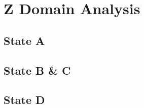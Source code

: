 \label{ch:ZDomainAnalysis}
\chapter{Z Domain Analysis}

\section{State A}


\clearpage
\section{State B \& C}


\clearpage
\section{State D}

